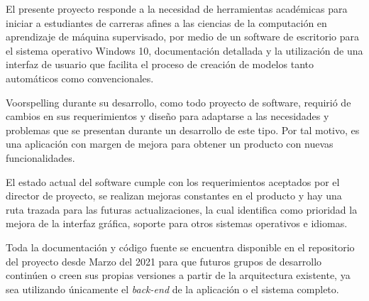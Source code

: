 El presente proyecto responde a la necesidad de herramientas académicas para iniciar a estudiantes de carreras afines a las ciencias de la computación en aprendizaje de máquina supervisado, por medio de un software de escritorio para el sistema operativo Windows 10,  documentación detallada y la utilización de una interfaz de usuario que facilita el proceso de creación de modelos tanto automáticos como convencionales.

Voorspelling durante su desarrollo, como todo proyecto de software, requirió de cambios en sus requerimientos y diseño para adaptarse a las necesidades y problemas que se presentan durante un desarrollo de este tipo. Por tal motivo, es una aplicación con margen de mejora para obtener un producto con nuevas funcionalidades.

El estado actual del software cumple con los requerimientos aceptados por el director de proyecto, se realizan mejoras constantes en el producto y hay una ruta trazada para las futuras actualizaciones, la cual identifica como prioridad la mejora de la interfaz gráfica, soporte para otros sistemas operativos e idiomas.

Toda la documentación y código fuente se encuentra disponible en el repositorio del proyecto desde Marzo del 2021 para que futuros grupos de desarrollo continúen o creen sus propias versiones a partir de la arquitectura existente, ya sea utilizando únicamente el \textit{back-end} de la aplicación o el sistema completo.
 

